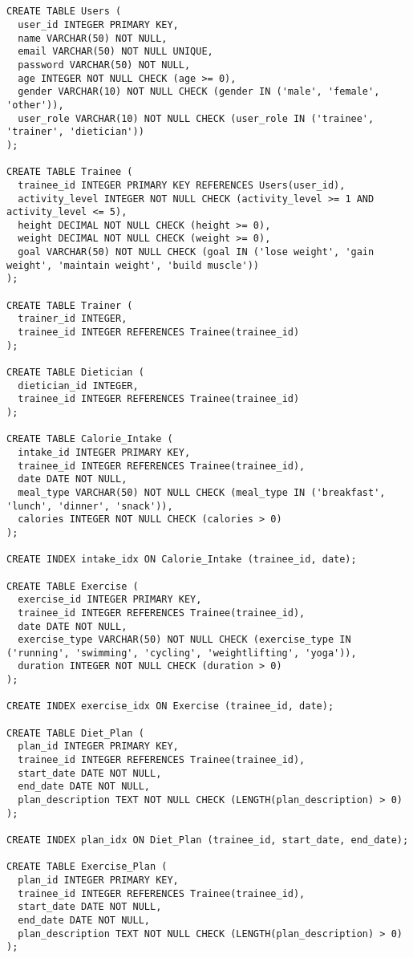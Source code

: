 \documentclass{article}
\begin{document}
\begin{verbatim}


CREATE TABLE Users (
  user_id INTEGER PRIMARY KEY,
  name VARCHAR(50) NOT NULL,
  email VARCHAR(50) NOT NULL UNIQUE,
  password VARCHAR(50) NOT NULL,
  age INTEGER NOT NULL CHECK (age >= 0),
  gender VARCHAR(10) NOT NULL CHECK (gender IN ('male', 'female', 'other')),
  user_role VARCHAR(10) NOT NULL CHECK (user_role IN ('trainee', 'trainer', 'dietician'))
);

CREATE TABLE Trainee (
  trainee_id INTEGER PRIMARY KEY REFERENCES Users(user_id),
  activity_level INTEGER NOT NULL CHECK (activity_level >= 1 AND activity_level <= 5),
  height DECIMAL NOT NULL CHECK (height >= 0),
  weight DECIMAL NOT NULL CHECK (weight >= 0),
  goal VARCHAR(50) NOT NULL CHECK (goal IN ('lose weight', 'gain weight', 'maintain weight', 'build muscle'))
);

CREATE TABLE Trainer (
  trainer_id INTEGER,
  trainee_id INTEGER REFERENCES Trainee(trainee_id)
);

CREATE TABLE Dietician (
  dietician_id INTEGER,
  trainee_id INTEGER REFERENCES Trainee(trainee_id)
);

CREATE TABLE Calorie_Intake (
  intake_id INTEGER PRIMARY KEY,
  trainee_id INTEGER REFERENCES Trainee(trainee_id),
  date DATE NOT NULL,
  meal_type VARCHAR(50) NOT NULL CHECK (meal_type IN ('breakfast', 'lunch', 'dinner', 'snack')),
  calories INTEGER NOT NULL CHECK (calories > 0)
);

CREATE INDEX intake_idx ON Calorie_Intake (trainee_id, date);

CREATE TABLE Exercise (
  exercise_id INTEGER PRIMARY KEY,
  trainee_id INTEGER REFERENCES Trainee(trainee_id),
  date DATE NOT NULL,
  exercise_type VARCHAR(50) NOT NULL CHECK (exercise_type IN ('running', 'swimming', 'cycling', 'weightlifting', 'yoga')),
  duration INTEGER NOT NULL CHECK (duration > 0)
);

CREATE INDEX exercise_idx ON Exercise (trainee_id, date);

CREATE TABLE Diet_Plan (
  plan_id INTEGER PRIMARY KEY,
  trainee_id INTEGER REFERENCES Trainee(trainee_id),
  start_date DATE NOT NULL,
  end_date DATE NOT NULL,
  plan_description TEXT NOT NULL CHECK (LENGTH(plan_description) > 0)
);

CREATE INDEX plan_idx ON Diet_Plan (trainee_id, start_date, end_date);

CREATE TABLE Exercise_Plan (
  plan_id INTEGER PRIMARY KEY,
  trainee_id INTEGER REFERENCES Trainee(trainee_id),
  start_date DATE NOT NULL,
  end_date DATE NOT NULL,
  plan_description TEXT NOT NULL CHECK (LENGTH(plan_description) > 0)
);


\end{verbatim}
\end{document}
